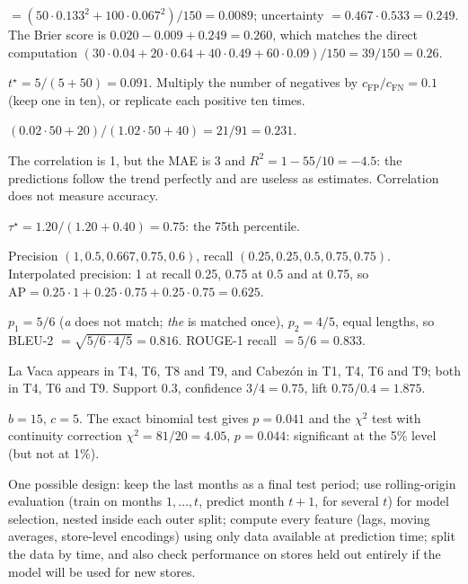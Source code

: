 \begin{description}[font=\bfseries,leftmargin=0pt,itemsep=5pt]
        $=(50\cdot0.133^2+100\cdot0.067^2)/150=0.0089$; uncertainty $=0.467\cdot0.533=0.249$. The
        Brier score is $0.020-0.009+0.249=0.260$, which matches the direct computation
        $(30\cdot0.04+20\cdot0.64+40\cdot0.49+60\cdot0.09)/150=39/150=0.26$.
  \item[\ref{exr:cost}] $t^\star=5/(5+50)=0.091$. Multiply the number of negatives by
        $c_{\mathrm{FP}}/c_{\mathrm{FN}}=0.1$ (keep one in ten), or replicate each positive ten
        times.
  \item[\ref{exr:fraud}] $(0.02\cdot50+20)/(1.02\cdot50+40)=21/91=0.231$.
  \item[\ref{exr:corr}] The correlation is 1, but the MAE is 3 and
        $R^2=1-55/10=-4.5$: the predictions follow the trend perfectly and are useless as
        estimates. Correlation does not measure accuracy.
  \item[\ref{exr:bakery}] $\tau^\star=1.20/(1.20+0.40)=0.75$: the 75th percentile.
  \item[\ref{exr:ap}] Precision $(1, 0.5, 0.667, 0.75, 0.6)$, recall $(0.25, 0.25, 0.5, 0.75,
        0.75)$. Interpolated precision: 1 at recall 0.25, 0.75 at 0.5 and at 0.75, so
        $\mathrm{AP}=0.25\cdot1+0.25\cdot0.75+0.25\cdot0.75=0.625$.
  \item[\ref{exr:bleu}] $p_1=5/6$ (\emph{a} does not match; \emph{the} is matched once),
        $p_2=4/5$, equal lengths, so BLEU-2 $=\sqrt{5/6\cdot4/5}=0.816$. ROUGE-1 recall $=5/6=0.833$.
  \item[\ref{exr:rule}] La Vaca appears in T4, T6, T8 and T9, and Cabez\'on in T1, T4, T6 and
        T9; both in T4, T6 and T9. Support $0.3$, confidence $3/4=0.75$, lift $0.75/0.4=1.875$.
  \item[\ref{exr:mcnemar}] $b=15$, $c=5$. The exact binomial test gives $p=0.041$ and the
        $\chi^2$ test with continuity correction $\chi^2=81/20=4.05$, $p=0.044$: significant at
        the 5\% level (but not at 1\%).
  \item[\ref{exr:protocol}] One possible design: keep the last months as a final test period;
        use rolling-origin evaluation (train on months $1,\dots,t$, predict month $t+1$, for
        several $t$) for model selection, nested inside each outer split; compute every
        feature (lags, moving averages, store-level encodings) using only data available at
        prediction time; split the data by time, and also check performance on
        stores held out entirely if the model will be used for new stores.

\end{description}
